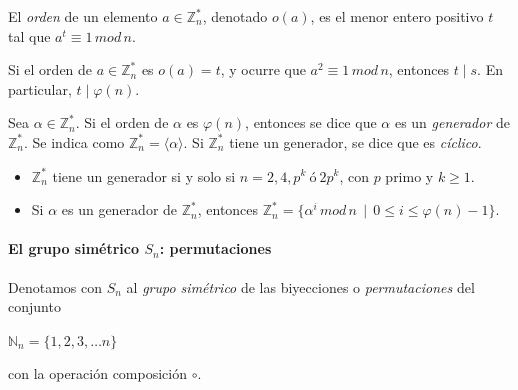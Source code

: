 \hfil

\begin{definition}
	El \textit{orden} de un elemento $a \in \mathbb{Z}^*_n$, denotado $o(a)$, es el menor entero positivo $t$ tal que $a^t \equiv 1 \, mod \, n$.
\end{definition}

\begin{proposition}
	Si el orden de $a \in \mathbb{Z}^*_n$ es $o(a)=t$, y ocurre que $a^2 \equiv 1 \, mod \, n$, entonces $t \mid s$. En particular, $t\mid \varphi(n)$.
\end{proposition}


\begin{definition}
	Sea $\alpha \in \mathbb{Z}^*_n$. Si el orden de $\alpha$ es $\varphi(n)$, entonces se dice que $\alpha$ es un \textit{generador} de $\mathbb{Z}^*_n$. Se indica como $\mathbb{Z}^*_n = \langle \alpha \rangle $. Si $\mathbb{Z}^*_n$ tiene un generador, se dice que es \textit{cíclico}.
\end{definition}

\begin{proposition}
	\hfil
	
	\begin{itemize}
		\item $\mathbb{Z}^*_n$ tiene un generador si y solo si $n=2,4,p^k\ ó\ 2p^k$, con $p$ primo y $k\geq 1$.
		\item Si $\alpha$ es un generador de $\mathbb{Z}^*_n$, entonces $\mathbb{Z}^*_n = \{\alpha^i \, mod \, n \, \mid \, 0 \leq i \leq \varphi(n)-1 \}$.
	\end{itemize}
\end{proposition}


\hfil

\paragraph{El grupo simétrico $S_n$: permutaciones}

\hfil


\begin{definition}
	Denotamos con $S_n$ al \textit{grupo simétrico} de las biyecciones o \textit{permutaciones} del conjunto
	\begin{center}
		$\mathbb{N}_n = \{1,2,3,\dots n\}$
	\end{center}
	con la operación composición $\circ$.
\end{definition}


